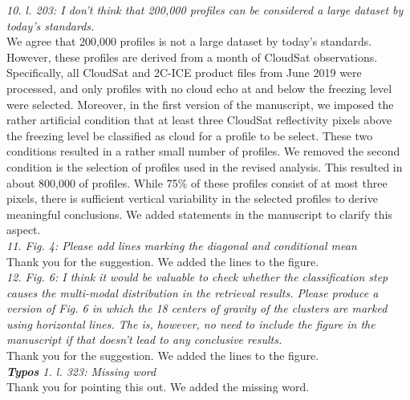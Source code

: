 \documentclass[12pt]{article}
\begin{document}
\newline
\textit{10. l. 203: I don't think that 200,000 profiles can be considered a large dataset by today's standards.}\\
\newline
We agree that 200,000 profiles is not a large dataset by today's standards.  However, these profiles are derived from a month of CloudSat observations.
Specifically, all CloudSat and 2C-ICE product files from June 2019 were processed, and only profiles with no cloud echo at 
and below the freezing level
were selected. Moreover, in the first version of the manuscript, we imposed the rather artificial condition that at least 
three CloudSat reflectivity pixels above the freezing level be classified as cloud for a profile to be select.
These two conditions resulted in a rather small number of profiles. 
We removed the second condition is the selection of profiles used in the revised analysis. This resulted in 
about 800,000 of profiles. While 75\% of these profiles consist of at most three pixels, there is sufficient
vertical variability in the selected profiles to derive meaningful conclusions. 
We added statements in the manuscript to clarify this aspect.\\
\newline
\textit{11. Fig. 4: Please add lines marking the diagonal and conditional mean}\\
\newline
Thank you for the suggestion. We added the lines to the figure.\\
\newline   
\textit{12. Fig. 6: I think it would be valuable to check whether the classification step causes the multi-modal distribution 
    in the retrieval results. Please produce a version of Fig. 6 in which the 18 centers of gravity of the clusters 
    are marked using horizontal lines. The is, however, no need to include the figure in the manuscript if that doesn't lead
     to any conclusive results.}\\
\newline
Thank you for the suggestion.  We added the lines to the figure.\\
\newline  
\textit{\textbf{Typos}
    1. l. 323: Missing word}\\
\newline
Thank you for pointing this out.  We added the missing word.\\
\newline
\end{document}
